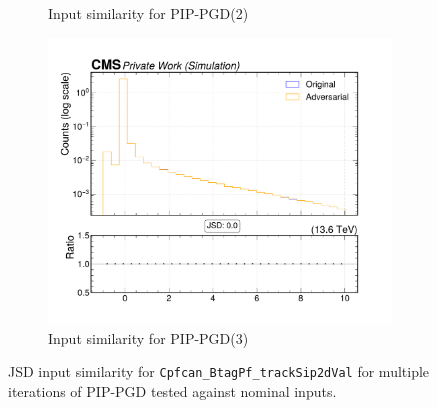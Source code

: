 \begin{figure}[htbp]
\begin{subfigure}[t]{0.32\textwidth}
    \caption*{Input similarity for PIP-PGD(2)}
  \end{subfigure}\hfill
  \begin{subfigure}[t]{0.32\textwidth}
    \includegraphics[width=\linewidth]{media/output/features/compare/combined_it_3/cmp_cpf_arr_Cpfcan_BtagPf_trackSip2dVal.pdf}
    \caption*{Input similarity for PIP-PGD(3)}
  \end{subfigure}

  \caption*{JSD input similarity for \texttt{Cpfcan\_BtagPf\_trackSip2dVal} for multiple iterations of PIP-PGD tested against nominal inputs.}
  \label{fig:combined_input_Cpfcan_BtagPf_trackSip2dVal}
\end{figure}

